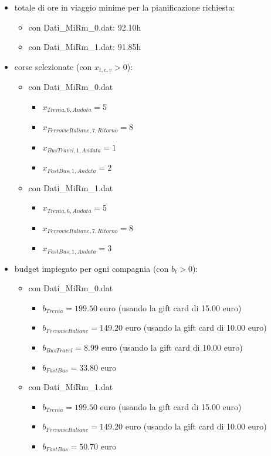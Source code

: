 \documentclass[main.tex]{subfiles}
\begin{document}
\begin{itemize}
    \item totale di ore in viaggio minime per la pianificazione richiesta:
    \begin{itemize}
        \item con Dati\_MiRm\_0.dat: 92.10h
        \item con Dati\_MiRm\_1.dat: 91.85h
    \end{itemize}
    \item corse selezionate (con $x_{t,c,v} > 0$):
    \begin{itemize}
        \item con Dati\_MiRm\_0.dat
        \begin{itemize}
            \item $x_{Trenia,6,Andata} = 5$
            \item $x_{FerrovieItaliane,7,Ritorno} = 8$
            \item $x_{BusTravel,1,Andata} = 1$
            \item $x_{FastBus,1,Andata} = 2$
        \end{itemize}
        \item con Dati\_MiRm\_1.dat
        \begin{itemize}
            \item $x_{Trenia,6,Andata} = 5$
            \item $x_{FerrovieItaliane,7,Ritorno} = 8$
            \item $x_{FastBus,1,Andata} = 3$
        \end{itemize}
    \end{itemize}
    \item budget impiegato per ogni compagnia (con $b_t > 0$):
    \begin{itemize}
        \item con Dati\_MiRm\_0.dat
        \begin{itemize}
            \item $b_{Trenia} = 199.50$ euro (usando la gift card di 15.00 euro)
            \item $b_{FerrovieItaliane} = 149.20$ euro (usando la gift card di 10.00 euro)
            \item $b_{BusTravel} =  8.99$ euro (usando la gift card di 10.00 euro)
            \item $b_{FastBus} = 33.80$ euro
        \end{itemize}
        \item con Dati\_MiRm\_1.dat
        \begin{itemize}
            \item $b_{Trenia} = 199.50$ euro (usando la gift card di 15.00 euro)
            \item $b_{FerrovieItaliane} = 149.20$ euro (usando la gift card di 10.00 euro)
            \item $b_{FastBus} = 50.70$ euro
        \end{itemize}
    \end{itemize}
\end{itemize}
\end{document}
